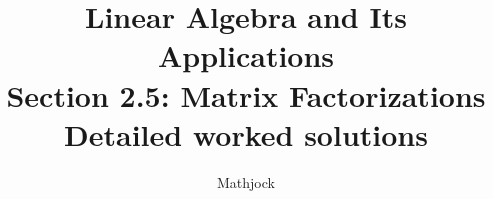 
\title{\textbf{Linear Algebra and Its Applications}\\[0.3em]Section 2.5: Matrix Factorizations\\[0.3em]\large Detailed worked solutions}
\author{Mathjock}
\date{}

\maketitle
\bookinfo
\tableofcontents
\clearpage
\renewcommand{\thesection}{2.\arabic{section}}
\renewcommand{\theHsection}{2.\arabic{section}}
\setcounter{section}{4}



